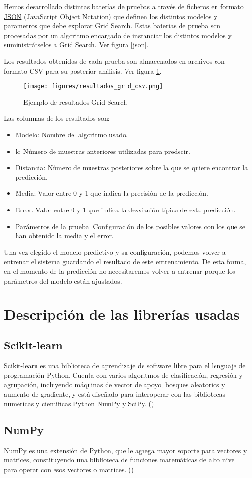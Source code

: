 	Hemos desarrollado distintas baterías de pruebas a través de ficheros en formato \href{www.json.org/json-es.html}{JSON} (JavaScript Object Notation) que definen los distintos modelos y parametros que debe explorar Grid Search.
	Estas baterias de prueba son procesadas por un algoritmo encargado de instanciar los distintos modelos y suministrárselos a Grid Search. Ver figura \ref{json}.

	Los resultados obtenidos de cada prueba son almacenados en archivos con formato CSV para su posterior análisis. Ver figura \ref{csv}.	

	\begin{figure}[htb]
		\begin{center}
			\texttt{[image: figures/resultados\_grid\_csv.png]}
			\caption{Ejemplo de resultados Grid Search \label{csv}}
		\end{center}
	\end{figure}

	Las columnas de los resultados son:
	\begin{itemize}
		\item Modelo: Nombre del algoritmo usado.
		\item k: Número de muestras anteriores utilizadas para predecir.
		\item Distancia: Número de muestras posteriores sobre la que se quiere encontrar la predicción.
		\item Media: Valor entre 0 y 1 que indica la precisión de la predicción.
		\item Error: Valor entre 0 y 1 que indica la desviación típica de esta predicción.
		\item Parámetros de la prueba: Configuración de los posibles valores con los que se han obtenido la media y el error.
	\end{itemize}

	Una vez elegido el modelo predictivo y su configuración, podemos volver a entrenar el sistema guardando el resultado de este entrenamiento. De esta forma, en el momento de la predicción no necesitaremos volver a entrenar porque los parámetros del modelo están ajustados.

\section{Descripción de las librerías usadas}
\label{makereference4.5}
	\subsection{Scikit-learn}
	\label{makereference4.5.1}
	Scikit-learn es una biblioteca de aprendizaje de software libre para el lenguaje de programación Python. Cuenta con varios algoritmos de clasificación, regresión y agrupación, incluyendo máquinas de vector de apoyo, bosques aleatorios y aumento de gradiente, y está diseñado para interoperar con las bibliotecas numéricas y científicas Python NumPy y SciPy. (\cite{ARP:Scikit:2017})
	
	\subsection{NumPy}
	\label{makereference4.5.2}
	NumPy es una extensión de Python, que le agrega mayor soporte para vectores y matrices, constituyendo una biblioteca de funciones matemáticas de alto nivel para operar con esos vectores o matrices. (\cite{ARP:Numpy:2017})